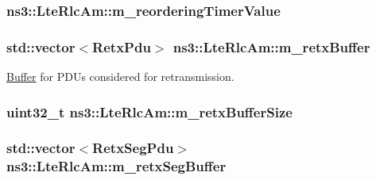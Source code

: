 \subsubsection[{\texorpdfstring{m\+\_\+reordering\+Timer\+Value}{m_reorderingTimerValue}}]{ ns3\+::\+Lte\+Rlc\+Am\+::m\+\_\+reordering\+Timer\+Value\hspace{0.3cm}{\ttfamily [private]}}\hypertarget{classns3_1_1LteRlcAm_a85886ad772e91a05ee0090a3bab3e343}{}\label{classns3_1_1LteRlcAm_a85886ad772e91a05ee0090a3bab3e343}
\subsubsection[{\texorpdfstring{m\+\_\+retx\+Buffer}{m_retxBuffer}}]{\setlength{\rightskip}{0pt plus 5cm}std\+::vector$<${\bf Retx\+Pdu}$>$ ns3\+::\+Lte\+Rlc\+Am\+::m\+\_\+retx\+Buffer\hspace{0.3cm}{\ttfamily [private]}}\hypertarget{classns3_1_1LteRlcAm_ab34bb5fce080a41395ad7ea5789af8d0}{}\label{classns3_1_1LteRlcAm_ab34bb5fce080a41395ad7ea5789af8d0}


\hyperlink{classns3_1_1Buffer}{Buffer} for P\+D\+Us considered for retransmission. 

\subsubsection[{\texorpdfstring{m\+\_\+retx\+Buffer\+Size}{m_retxBufferSize}}]{\setlength{\rightskip}{0pt plus 5cm}uint32\+\_\+t ns3\+::\+Lte\+Rlc\+Am\+::m\+\_\+retx\+Buffer\+Size\hspace{0.3cm}{\ttfamily [private]}}\hypertarget{classns3_1_1LteRlcAm_af270916ffd1805b027a7b9cc05c91e7d}{}\label{classns3_1_1LteRlcAm_af270916ffd1805b027a7b9cc05c91e7d}
\subsubsection[{\texorpdfstring{m\+\_\+retx\+Seg\+Buffer}{m_retxSegBuffer}}]{\setlength{\rightskip}{0pt plus 5cm}std\+::vector$<${\bf Retx\+Seg\+Pdu}$>$ ns3\+::\+Lte\+Rlc\+Am\+::m\+\_\+retx\+Seg\+Buffer\hspace{0.3cm}{\ttfamily [private]}}\hypertarget{classns3_1_1LteRlcAm_aa602fa2ca8ceb4dd6261150ae8ce7073}{}\label{classns3_1_1LteRlcAm_aa602fa2ca8ceb4dd6261150ae8ce7073}
